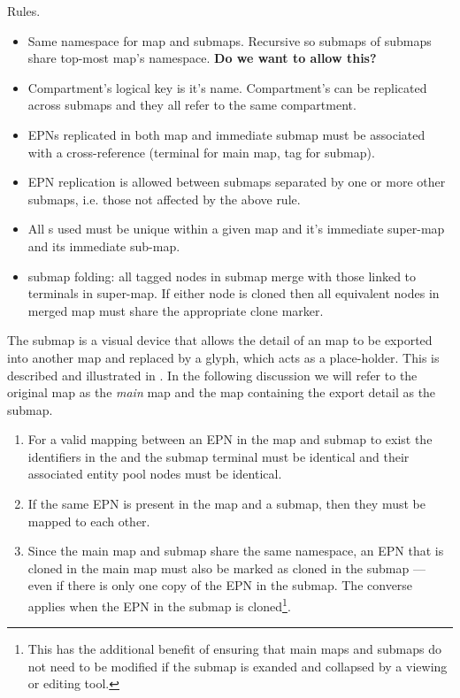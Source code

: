 Rules.

\begin{itemize}
\item Same namespace for map and submaps. Recursive so submaps of
  submaps share top-most map's namespace. \textbf{Do we want to allow this?}
\item Compartment's logical key is it's name. Compartment's can be
  replicated across submaps and they all refer to the same
  compartment.
\item EPNs replicated in both map and immediate submap must be
  associated with a cross-reference (terminal for main map, tag for
  submap).
\item EPN replication is allowed between submaps separated by one or more other
  submaps, i.e. those not affected by the above rule.
\item All s used must be unique within a given
  map and it's immediate super-map and its immediate sub-map.
\item submap folding: all tagged nodes in submap merge with those
  linked to terminals in super-map. If either node is cloned then all
  equivalent nodes in merged map must share the appropriate clone
  marker.
\end{itemize}

The submap is a visual device that allows the detail of an \PD map to
be exported into another \PD map and replaced by a 
glyph, which acts as a place-holder. This is described and illustrated
in . In the following discussion we will refer to the
original map as the \emph{main} map and the map containing the export
detail as the submap.

\begin{enumerate}
\item For a valid mapping between an EPN in the map and submap to
  exist the identifiers in the  and the submap terminal
  must be identical and their associated entity pool nodes must be
  identical.
\item If the same EPN is present in the map and a submap, then they
  must be mapped to each other.
\item Since the main map and submap share the same namespace, an EPN
  that is cloned in the main map must also be marked as cloned in the
  submap --- even if there is only one copy of the EPN in the
  submap. The converse applies when the EPN in the submap is
  cloned\footnote{This has the additional benefit of ensuring that
    main maps and submaps do not need to be modified if the submap is
    exanded and collapsed by a viewing or editing tool.}.
\end{enumerate}



